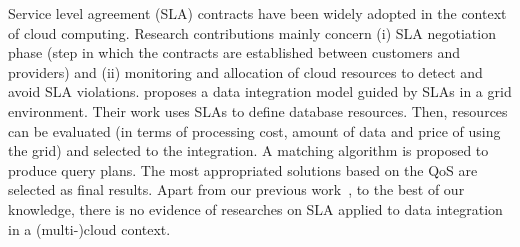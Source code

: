 %

Service level agreement (SLA) contracts have been widely adopted in the context of cloud computing. Research contributions mainly concern (i) SLA negotiation phase (step in which the contracts are established between customers and providers) and (ii) monitoring and allocation of cloud resources to detect and avoid SLA violations.
\cite{Nie07} proposes a data integration model guided by SLAs in a grid
environment. Their work uses SLAs to define database resources. Then, resources
can be evaluated (in terms of processing cost, amount of data and price of using the grid) and selected to the integration. A matching algorithm is proposed to produce query plans. The most appropriated solutions based on the QoS are selected as final results. Apart from our previous work~\cite{Bennani2014}, to the best of our knowledge, there is no evidence of researches on SLA applied to data integration in a (multi-)cloud context.

